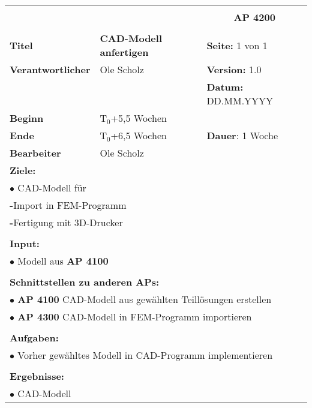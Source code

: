 \clearpage
\begin{table}[!h]
	\begin{center}
		\begin{tabular}{|p{35mm}||p{55mm}|p{50mm}||p{40mm}|}
			\hline
			\multicolumn{3}{|l||}{\textbf{}} & \multicolumn{1}{c|}{}\\
			\multicolumn{3}{|l||}{\textbf{}} & \multicolumn{1}{c|}{\textbf{AP 4200}}\\
			\multicolumn{3}{|l||}{\textbf{}} & \multicolumn{1}{c|}{}\\
			\hline\hline
			\textbf{Titel} & \multicolumn{2}{p{7cm}||}{\textbf{CAD-Modell anfertigen}} 
			& \textbf{Seite:} 1 von 1\\
			\hline
			\textbf{Verantwortlicher} & \multicolumn{2}{l||}{Ole Scholz} & \textbf{Version:} 1.0\\
			\hline
			\multicolumn{3}{|l||}{} & \textbf{Datum:} DD.MM.YYYY\\
			\hline\hline
			\textbf{Beginn} & \multicolumn{2}{l||}{T$_0$+5,5 Wochen} & \\
			\hline
			\textbf{Ende} & \multicolumn{2}{l||}{T$_0$+6,5 Wochen} & \textbf{Dauer}: 1 Woche\\
			\hline\hline
			\textbf{Bearbeiter} & \multicolumn{3}{l|}{Ole Scholz}\\
			\hline\hline
			\multicolumn{4}{|p{150mm}|}{\textbf{Ziele:}}\\
			\multicolumn{4}{|p{150mm}|}{$\bullet$ CAD-Modell für}\\
			\multicolumn{4}{|p{150mm}|}{\qquad \textbf{-}Import in FEM-Programm}\\
			\multicolumn{4}{|p{150mm}|}{\qquad \textbf{-}Fertigung mit 3D-Drucker}\\
			\multicolumn{4}{|p{150mm}|}{}\\
			\multicolumn{4}{|p{150mm}|}{\textbf{Input:}}\\
			\multicolumn{4}{|p{150mm}|}{$\bullet$ Modell aus \textbf{AP 4100}}\\
			\multicolumn{4}{|p{150mm}|}{}\\
			\multicolumn{4}{|p{150mm}|}{\textbf{Schnittstellen zu anderen APs:}}\\
			\multicolumn{4}{|p{150mm}|}{$\bullet$ \textbf{AP 4100} CAD-Modell aus gewählten Teillösungen erstellen}\\
			\multicolumn{4}{|p{150mm}|}{$\bullet$ \textbf{AP 4300} CAD-Modell in FEM-Programm importieren}\\
			\multicolumn{4}{|p{150mm}|}{}\\
			\multicolumn{4}{|p{150mm}|}{\textbf{Aufgaben:}}\\
			\multicolumn{4}{|p{150mm}|}{$\bullet$ Vorher gewähltes Modell in CAD-Programm implementieren}\\
			\multicolumn{4}{|p{150mm}|}{}\\
			\multicolumn{4}{|p{150mm}|}{\textbf{Ergebnisse:}}\\
			\multicolumn{4}{|p{150mm}|}{$\bullet$ CAD-Modell}\\
			\hline
		\end{tabular}
	\end{center}
\end{table}

